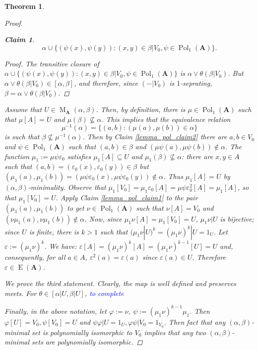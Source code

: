 \documentclass{amsart}
\theoremstyle{plain}
\newtheorem{theorem}{Theorem}[section]
\newtheorem{claim}{Claim}
\theoremstyle{definition}
\theoremstyle{remark}
\def\phi{\varphi}
\def\epsilon{\varepsilon}
\DeclareMathOperator{\Pol}{Pol}
\DeclareMathOperator{\Id}{E}
\DeclareMathOperator{\M}{M}
\begin{document}
\begin{theorem}
\begin{proof}
\begin{claim}
\begin{equation*}
                \alpha \cup \{(\psi(x), \psi(y)) : (x,y) \in \beta|V_0, \psi \in \Pol_1(\mathbf{A})\} \text{.}
            \end{equation*}
            \begin{proof}
                The transitive closure of $\alpha \cup \{(\psi(x), \psi(y)) : (x,y) \in \beta|V_0, \psi \in \Pol_1(\mathbf{A})\}$ is $\alpha \lor \theta(\beta|V_0)$. 
                But $\alpha \lor \theta(\beta|V_0) \in [\alpha, \beta]$, and therefore, since $(-|V_0)$ is $1$-seprating, $\beta=\alpha \lor \theta(\beta|V_0)$. 
            \end{proof}
        \end{claim}
        Assume that $U \in \M_{\mathbf{A}}(\alpha, \beta)$. 
        Then, by definition, there is $\mu \in \Pol_1(\mathbf{A})$ such that $\mu[A] =U$ and $\mu(\beta) \nsubseteq \alpha$. 
        This implies that the equivalence relation 
        \begin{equation*}
            \mu^{-1}(\alpha)=\{(a,b): (\mu(a), \mu(b)) \in \alpha\} 
        \end{equation*}
        is such that $\beta \nsubseteq \mu^{-1}(\alpha)$. 
        Then by Claim \ref{lemma_pol_claim2} there are $a,b \in V_0$ and $\psi \in \Pol_1(\mathbf{A})$ such that $(a,b) \in \beta$ and $(\mu \psi(a), \mu \psi(b)) \notin \alpha$. 
        The function $\mu_1:=\mu \psi \epsilon_0$ satisfies $\mu_1[A] \subseteq U$ and $\mu_1(\beta) \nsubseteq \alpha$: 
        there are $x,y \in A$ such that $(a,b)=(\epsilon_0(x), \epsilon_0(y)) \in \beta $ but $(\mu_1(a), \mu_1(b))=(\mu \psi \epsilon_0(x), \mu \psi \epsilon_0(y)) \notin \alpha$. 
        Thus $\mu_1[A] = U$ by $(\alpha, \beta)$-minimality. 
        Observe that $\mu_1[V_0]=\mu_1 \epsilon_0 [A] = \mu \psi \epsilon^2_0[A] = \mu_1[A]$, so that $\mu_1[V_0] = U$. 
        Apply Claim \ref{lemma_pol_claim1} to the pair $(\mu_1(a), \mu_1(b))$ to get $\nu \in \Pol_1(\mathbf{A})$ such that $\nu[A]=V_0$ and $(\nu \mu_1(a), \nu \mu_1(b)) \notin \alpha$. 
        Now, since $\mu_1 \nu [A] = \mu_1[V_0] = U$, 
        $\mu_1 \nu | U $ is bijective; since $U$ is finite, there is $k >1$ such that $(\mu_1 \nu |U )^k = (\mu_1 \nu)^k |U =1_U$. 
        Let $\epsilon:=(\mu_1 \nu)^k$.
        We have: $\epsilon[A] = (\mu_1 \nu)^k[A]=(\mu_1 \nu)^{k-1}[U]=U$ and, consequently, for all $a \in A$, $\epsilon^2(a)=\epsilon(a)$ since $\epsilon(a) \in U$. 
        Therefore $\epsilon \in \Id(\mathbf{A})$. 

        We prove the third statement. 
        Clearly, the map is well defined and preserves meets. 
        For $\theta \in [\alpha|U, \beta|U]$, 
        \textcolor{blue}{to complete} 

        Finally, in the above notation, let $\phi:=\nu$, $\psi:=(\mu_1 \nu)^{k-1} \mu_1$. 
        Then $\phi[U] = V_0, \psi[V_0]=U$ and $\psi \phi | U = 1_U, \phi \psi | V_0 = 1_{V_0}$. 
        Then fact that any $(\alpha, \beta)$-minimal set is polynomially isomorphic to $V_0$ implies that any two $(\alpha, \beta)$-minimal sets are polynomially isomorphic. 
    \end{proof}
\end{theorem}
\end{document}
